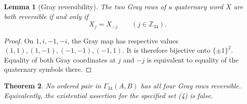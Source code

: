 \documentclass[11pt]{article}
\newtheorem{theorem}{Theorem}
\newtheorem{lemma}[theorem]{Lemma}
\newcommand{\Z}{\mathbb Z}
\begin{document}
\begin{lemma}[Gray reversibility]
The two Gray rows of a quaternary word $X$ are both reversible if and only if
\[
 X_j=X_{-j}\qquad(j\in\Z_{34}).
 \tag{7}
\]
\end{lemma}

\begin{proof}
On $1,i,-1,-i$, the Gray map has respective values
$(1,1),(1,-1),(-1,-1),(-1,1)$.  It is therefore bijective onto
$\{\pm1\}^2$.  Equality of both Gray coordinates at $j$ and $-j$ is
equivalent to equality of the quaternary symbols there.
\end{proof}

\begin{theorem}
No ordered pair in $\Gamma_{34}(A,B)$ has all four Gray rows reversible.
Equivalently, the existential assertion for the specified set (4) is false.
\end{theorem}
\end{document}
